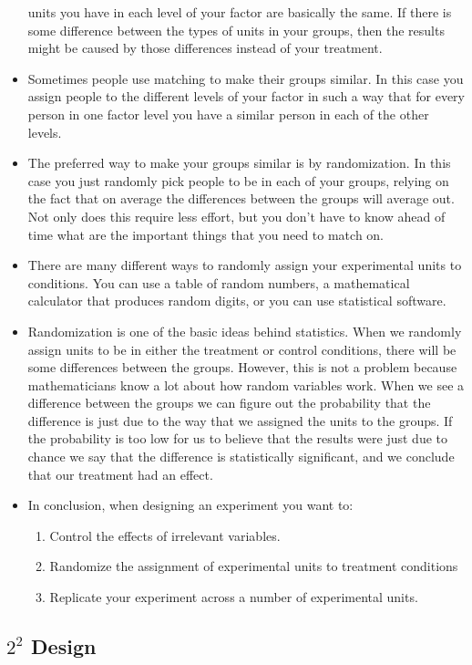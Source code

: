 \begin{itemize}
	units you have in each level of your factor are basically the same. If there is some difference between
	the types of units in your groups, then the results might be caused by those differences instead of your
	treatment.
	\item Sometimes people use matching to make their groups similar. In this case you assign people to the
	different levels of your factor in such a way that for every person in one factor level you have a similar
	person in each of the other levels.
	\item The preferred way to make your groups similar is by randomization. In this case you just randomly
	pick people to be in each of your groups, relying on the fact that on average the differences between
	the groups will average out. Not only does this require less effort, but you don't have to know ahead
	of time what are the important things that you need to match on.
	\item There are many different ways to randomly assign your experimental units to conditions. You can use
	a table of random numbers, a mathematical calculator that produces random digits, or you can use
	statistical software.
	\item Randomization is one of the basic ideas behind statistics. When we randomly assign units to be in
	either the treatment or control conditions, there will be some differences between the groups. However,
	this is not a problem because mathematicians know a lot about how random variables work. When we
	see a difference between the groups we can figure out the probability that the difference is just due to
	the way that we assigned the units to the groups. If the probability is too low for us to believe that the
	results were just due to chance we say that the difference is statistically significant, and we conclude
	that our treatment had an effect.
	\item In conclusion, when designing an experiment you want to:
	\begin{enumerate}
		\item Control the effects of irrelevant variables.
		\item Randomize the assignment of experimental units to treatment conditions
		\item Replicate your experiment across a number of experimental units.
	\end{enumerate}
\end{itemize}




\subsection{ $2^2$ Design}


